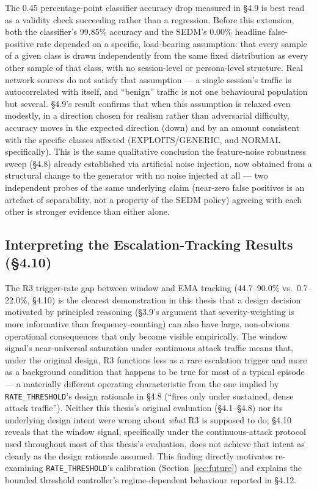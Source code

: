 The 0.45 percentage-point classifier accuracy drop measured in \S4.9 is
best read as a validity check succeeding rather than a regression.
Before this extension, both the classifier's 99.85\% accuracy and the
SEDM's 0.00\% headline false-positive rate depended on a specific,
load-bearing assumption: that every sample of a given class is drawn
independently from the same fixed distribution as every other sample of
that class, with no session-level or persona-level structure.
Real network sources do not satisfy that assumption --- a single session's
traffic is autocorrelated with itself, and ``benign'' traffic is not one
behavioural population but several.
\S4.9's result confirms that when this assumption is relaxed even
modestly, in a direction chosen for realism rather than adversarial
difficulty, accuracy moves in the expected direction (down) and by an
amount consistent with the specific classes affected (EXPLOITS/GENERIC, and
NORMAL specifically).
This is the same qualitative conclusion the feature-noise robustness sweep
(\S4.8) already established via artificial noise injection, now obtained
from a structural change to the generator with no noise injected at all
--- two independent probes of the same underlying claim (near-zero false
positives is an artefact of separability, not a property of the SEDM
policy) agreeing with each other is stronger evidence than either alone.

\subsection{Interpreting the Escalation-Tracking Results (\S4.10)}
\label{sec:disc_escalation_mode}

The R3 trigger-rate gap between window and EMA tracking
(44.7--90.0\% vs.\ 0.7--22.0\%, \S4.10) is the clearest demonstration in
this thesis that a design decision motivated by principled reasoning
(\S3.9's argument that severity-weighting is more informative than
frequency-counting) can also have large, non-obvious operational
consequences that only become visible empirically.
The window signal's near-universal saturation under continuous attack
traffic means that, under the original design, R3 functions less as a rare
escalation trigger and more as a background condition that happens to be
true for most of a typical episode --- a materially different operating
characteristic from the one implied by \texttt{RATE\_THRESHOLD}'s design
rationale in \S4.8 (``fires only under sustained, dense attack traffic'').
Neither this thesis's original evaluation (\S4.1--\S4.8) nor its underlying
design intent were wrong about \emph{what} R3 is supposed to do; \S4.10
reveals that the window signal, specifically under the continuous-attack
protocol used throughout most of this thesis's evaluation, does not
achieve that intent as cleanly as the design rationale assumed.
This finding directly motivates re-examining \texttt{RATE\_THRESHOLD}'s
calibration (Section~\ref{sec:future}) and explains the bounded threshold
controller's regime-dependent behaviour reported in \S4.12.

